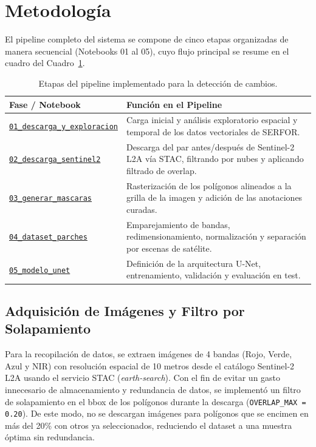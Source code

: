 \documentclass{article}
\begin{document}
\section{Metodología}
El pipeline completo del sistema se compone de cinco etapas organizadas de manera secuencial (Notebooks 01 al 05), cuyo flujo principal se resume en el cuadro del Cuadro~\ref{tab:pipeline}.

\begin{table}[ht]
\centering
\small
\begin{tabularx}{\columnwidth}{@{}lX@{}}
\toprule
\textbf{Fase / Notebook} & \textbf{Función en el Pipeline} \\
\midrule
\href{https://github.com/uni-maestria/deep-peru-forest/blob/main/01_descarga_y_exploracion.ipynb}{\texttt{01\_descarga\_y\_exploracion}} & Carga inicial y análisis exploratorio espacial y temporal de los datos vectoriales de SERFOR. \\
\href{https://github.com/uni-maestria/deep-peru-forest/blob/main/02_descarga_sentinel2.ipynb}{\texttt{02\_descarga\_sentinel2}} & Descarga del par antes/después de Sentinel-2 L2A vía STAC, filtrando por nubes y aplicando filtrado de overlap. \\
\href{https://github.com/uni-maestria/deep-peru-forest/blob/main/03_generar_mascaras.ipynb}{\texttt{03\_generar\_mascaras}} & Rasterización de los polígonos alineados a la grilla de la imagen y adición de las anotaciones curadas. \\
\href{https://github.com/uni-maestria/deep-peru-forest/blob/main/04_dataset_parches.ipynb}{\texttt{04\_dataset\_parches}} & Emparejamiento de bandas, redimensionamiento, normalización y separación por escenas de satélite. \\
\href{https://github.com/uni-maestria/deep-peru-forest/blob/main/05_modelo_unet.ipynb}{\texttt{05\_modelo\_unet}} & Definición de la arquitectura U-Net, entrenamiento, validación y evaluación en test. \\
\bottomrule
\end{tabularx}
\caption{Etapas del pipeline implementado para la detección de cambios.}
\label{tab:pipeline}
\end{table}

\subsection*{Adquisición de Imágenes y Filtro por Solapamiento}
Para la recopilación de datos, se extraen imágenes de 4 bandas (Rojo, Verde, Azul y NIR) con resolución espacial de 10 metros desde el catálogo Sentinel-2 L2A usando el servicio STAC (\textit{earth-search}). Con el fin de evitar un gasto innecesario de almacenamiento y redundancia de datos, se implementó un filtro de solapamiento en el bbox de los polígonos durante la descarga (\texttt{OVERLAP\_MAX = 0.20}). De este modo, no se descargan imágenes para polígonos que se encimen en más del 20\% con otros ya seleccionados, reduciendo el dataset a una muestra óptima sin redundancia.
\end{document}
